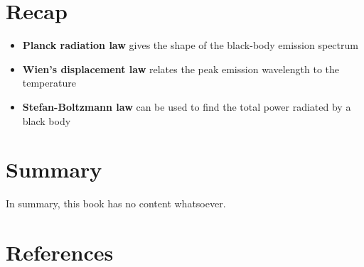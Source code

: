 \documentclass[
  letterpaper,
  DIV=11,
  numbers=noendperiod]{scrreprt}
\providecommand{\tightlist}{%
  \setlength{\itemsep}{0pt}\setlength{\parskip}{0pt}}\usepackage{longtable,booktabs,array}
\newlength{\cslhangindent}
\newlength{\cslentryspacingunit} %
\newenvironment{CSLReferences}[2] %
 {%
  \setlength{\parindent}{0pt}
  \ifodd #1
  \let\oldpar\par
  \def\par{\hangindent=\cslhangindent\oldpar}
  \fi
  \setlength{\parskip}{#2\cslentryspacingunit}
 }%
 {}
\begin{document}

\hypertarget{recap-1}{%
\chapter{Recap}\label{recap-1}}

\begin{itemize}
\tightlist
\item
  \textbf{Planck radiation law} gives the shape of the black-body
  emission spectrum
\item
  \textbf{Wien's displacement law} relates the peak emission wavelength
  to the temperature
\item
  \textbf{Stefan-Boltzmann law} can be used to find the total power
  radiated by a black body
\end{itemize}


\hypertarget{summary}{%
\chapter{Summary}\label{summary}}

In summary, this book has no content whatsoever.


\hypertarget{references}{%
\chapter*{References}\label{references}}


\hypertarget{refs}{}
\begin{CSLReferences}{0}{0}
\end{CSLReferences}
\end{document}
